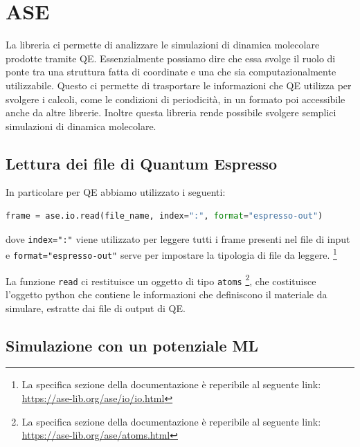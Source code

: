 

\section{ASE} %
La libreria \cite{ase-doc} ci permette di analizzare le simulazioni di dinamica molecolare prodotte tramite QE. Essenzialmente possiamo dire che essa svolge il ruolo di ponte tra una struttura fatta di coordinate e una che sia computazionalmente utilizzabile. Questo ci permette di trasportare le informazioni che QE utilizza per svolgere i calcoli, come le condizioni di periodicità, in un formato poi accessibile anche da altre librerie.
Inoltre questa libreria rende possibile svolgere semplici simulazioni di dinamica molecolare.
\\

\subsection{Lettura dei file di Quantum Espresso}

In particolare per QE abbiamo utilizzato i seguenti:

\begin{lstlisting}[caption={Snippet usato per il dataset A}, label={code:ase-dataset-a}, language=Python]
    frame = ase.io.read(file_name, index=":", format="espresso-out")
\end{lstlisting}

dove \texttt{index=":"} viene utilizzato per leggere tutti i frame presenti nel file di input e \texttt{format="espresso-out"} serve per impostare la tipologia di file da leggere.
\footnote{
La specifica sezione della documentazione è reperibile al seguente link: \url{https://ase-lib.org/ase/io/io.html}
}

La funzione \texttt{read} ci restituisce un oggetto di tipo \texttt{atoms}
\footnote{
La specifica sezione della documentazione è reperibile al seguente link: \url{https://ase-lib.org/ase/atoms.html}
}, che costituisce l'oggetto python che contiene le informazioni che definiscono il materiale da simulare, estratte dai file di output di QE.


\subsection{Simulazione con un potenziale ML}

